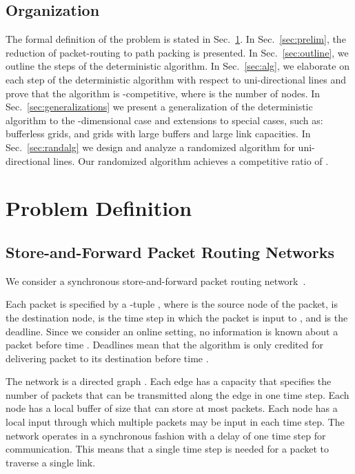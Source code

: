 \documentclass[11pt]{article}
\newenvironment{proof sketch}[1]{\noindent {\emph{Proof sketch of #1:}}}{\hfill \qed}
\begin{document}
\subsection{Organization}
The formal definition of the problem is stated in Sec.~\ref{sec:problem}.
In Sec.~\ref{sec:prelim}, the reduction of packet-routing to path packing is presented.
In Sec.~\ref{sec:outline}, we outline the steps of the deterministic algorithm.
In Sec.~\ref{sec:alg}, we elaborate on each step of the deterministic algorithm with respect to uni-directional lines and prove that the algorithm is -competitive, where  is the number of nodes. In Sec.~\ref{sec:generalizations} we present a
generalization of the deterministic algorithm to the
-dimensional case and extensions to special cases, such
as: bufferless grids, and grids with large buffers and
large link capacities. In Sec.~\ref{sec:randalg} we design
and analyze a randomized algorithm for uni-directional
lines. Our randomized algorithm achieves a competitive
ratio of .


\section{Problem Definition}\label{sec:problem}
\label{sect:problem}

\subsection{Store-and-Forward Packet Routing Networks}
We consider a synchronous store-and-forward packet
routing network~\cite{AKOR,AKK,AZ}.

Each packet is specified by a -tuple , where  is the source node of the packet,  is the destination node,   is the time step in which the packet is input to , and  is the deadline.  Since we consider an online setting, no information is known about a packet  before time .  Deadlines mean that the algorithm is only credited for delivering packet  to its destination  before time .

The network is a directed graph .
Each edge has a capacity  that specifies the number of packets that can be transmitted along the edge in one time step.  Each node has a local buffer of size  that can store at most  packets.
Each node has a local input through which multiple packets may be input in each time step.  The network operates in a synchronous fashion with a delay of one time step for communication. This means that a single time step is needed for a packet to traverse a single link.
\end{document}
